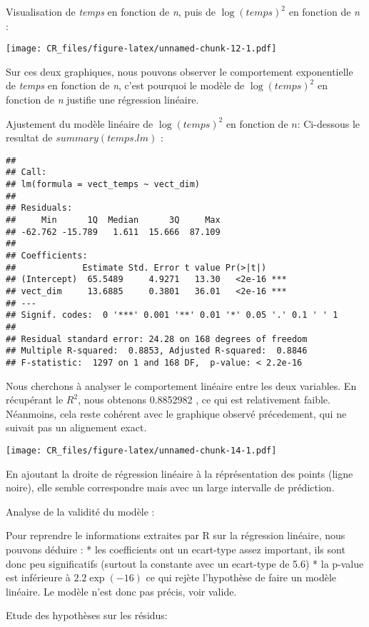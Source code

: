 \documentclass[
]{article}
\begin{document}
Visualisation de \emph{temps} en fonction de \emph{n}, puis de
\emph{\(\log(temps)^2\)} en fonction de \emph{n} :

\texttt{[image: CR\_files/figure-latex/unnamed-chunk-12-1.pdf]}

Sur ces deux graphiques, nous pouvons observer le comportement
exponentielle de \emph{temps} en fonction de \emph{n}, c'est pourquoi le
modèle de \emph{\(\log(temps)^2\)} en fonction de \emph{n} justifie une
régression linéaire.

Ajustement du modèle linéaire de \emph{\(\log(temps)^2\)} en fonction de
\emph{\(n\)}: Ci-dessous le resultat de \(summary(temps.lm)\) :

\begin{verbatim}
## 
## Call:
## lm(formula = vect_temps ~ vect_dim)
## 
## Residuals:
##     Min      1Q  Median      3Q     Max 
## -62.762 -15.789   1.611  15.666  87.109 
## 
## Coefficients:
##             Estimate Std. Error t value Pr(>|t|)    
## (Intercept)  65.5489     4.9271   13.30   <2e-16 ***
## vect_dim     13.6885     0.3801   36.01   <2e-16 ***
## ---
## Signif. codes:  0 '***' 0.001 '**' 0.01 '*' 0.05 '.' 0.1 ' ' 1
## 
## Residual standard error: 24.28 on 168 degrees of freedom
## Multiple R-squared:  0.8853, Adjusted R-squared:  0.8846 
## F-statistic:  1297 on 1 and 168 DF,  p-value: < 2.2e-16
\end{verbatim}

Nous cherchons à analyser le comportement linéaire entre les deux
variables. En récupérant le \(R^2\), nous obtenons 0.8852982 , ce qui
est relativement faible. Néanmoins, cela reste cohérent avec le
graphique observé précedement, qui ne suivait pas un alignement exact.

\texttt{[image: CR\_files/figure-latex/unnamed-chunk-14-1.pdf]}

En ajoutant la droite de régression linéaire à la réprésentation des
points (ligne noire), elle semble correspondre mais avec un large
intervalle de prédiction.

Analyse de la validité du modèle :

Pour reprendre le informations extraites par R sur la régression
linéaire, nous pouvons déduire : * les coefficients ont un ecart-type
assez important, ils sont donc peu significatifs (surtout la constante
avec un ecart-type de 5.6) * la p-value est inférieure à
\(2.2\exp(-16)\) ce qui rejète l'hypothèse de faire un modèle linéaire.
Le modèle n'est donc pas précis, voir valide.

Etude des hypothèses sur les résidus:
\end{document}
